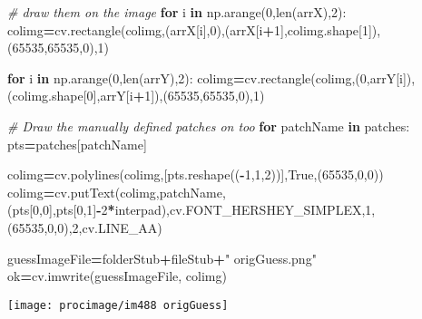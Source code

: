 \documentclass[
]{article}
\newenvironment{Shaded}{\begin{snugshade}}{\end{snugshade}}
\newcommand{\BuiltInTok}[1]{#1}
\newcommand{\CommentTok}[1]{\textcolor[rgb]{0.56,0.35,0.01}{\textit{#1}}}
\newcommand{\ControlFlowTok}[1]{\textcolor[rgb]{0.13,0.29,0.53}{\textbf{#1}}}
\newcommand{\DecValTok}[1]{\textcolor[rgb]{0.00,0.00,0.81}{#1}}
\newcommand{\KeywordTok}[1]{\textcolor[rgb]{0.13,0.29,0.53}{\textbf{#1}}}
\newcommand{\NormalTok}[1]{#1}
\newcommand{\OperatorTok}[1]{\textcolor[rgb]{0.81,0.36,0.00}{\textbf{#1}}}
\newcommand{\StringTok}[1]{\textcolor[rgb]{0.31,0.60,0.02}{#1}}
\newcommand{\VariableTok}[1]{\textcolor[rgb]{0.00,0.00,0.00}{#1}}
\begin{document}
\begin{Shaded}
\begin{Highlighting}[]
\CommentTok{\# draw them on the image}
\ControlFlowTok{for}\NormalTok{ i }\KeywordTok{in}\NormalTok{ np.arange(}\DecValTok{0}\NormalTok{,}\BuiltInTok{len}\NormalTok{(arrX),}\DecValTok{2}\NormalTok{):}
\NormalTok{  colimg}\OperatorTok{=}\NormalTok{cv.rectangle(colimg,(arrX[i],}\DecValTok{0}\NormalTok{),(arrX[i}\OperatorTok{+}\DecValTok{1}\NormalTok{],colimg.shape[}\DecValTok{1}\NormalTok{]),(}\DecValTok{65535}\NormalTok{,}\DecValTok{65535}\NormalTok{,}\DecValTok{0}\NormalTok{),}\DecValTok{1}\NormalTok{)}
  
\ControlFlowTok{for}\NormalTok{ i }\KeywordTok{in}\NormalTok{ np.arange(}\DecValTok{0}\NormalTok{,}\BuiltInTok{len}\NormalTok{(arrY),}\DecValTok{2}\NormalTok{):}
\NormalTok{  colimg}\OperatorTok{=}\NormalTok{cv.rectangle(colimg,(}\DecValTok{0}\NormalTok{,arrY[i]),(colimg.shape[}\DecValTok{0}\NormalTok{],arrY[i}\OperatorTok{+}\DecValTok{1}\NormalTok{]),(}\DecValTok{65535}\NormalTok{,}\DecValTok{65535}\NormalTok{,}\DecValTok{0}\NormalTok{),}\DecValTok{1}\NormalTok{)}
  
\CommentTok{\# Draw the manually defined patches on too}
\ControlFlowTok{for}\NormalTok{ patchName }\KeywordTok{in}\NormalTok{ patches:}
\NormalTok{    pts}\OperatorTok{=}\NormalTok{patches[patchName]}

\NormalTok{    colimg}\OperatorTok{=}\NormalTok{cv.polylines(colimg,[pts.reshape((}\OperatorTok{{-}}\DecValTok{1}\NormalTok{,}\DecValTok{1}\NormalTok{,}\DecValTok{2}\NormalTok{))],}\VariableTok{True}\NormalTok{,(}\DecValTok{65535}\NormalTok{,}\DecValTok{0}\NormalTok{,}\DecValTok{0}\NormalTok{))}
\NormalTok{    colimg}\OperatorTok{=}\NormalTok{cv.putText(colimg,patchName,(pts[}\DecValTok{0}\NormalTok{,}\DecValTok{0}\NormalTok{],pts[}\DecValTok{0}\NormalTok{,}\DecValTok{1}\NormalTok{]}\OperatorTok{{-}}\DecValTok{2}\OperatorTok{*}\NormalTok{interpad),cv.FONT\_HERSHEY\_SIMPLEX,}\DecValTok{1}\NormalTok{,(}\DecValTok{65535}\NormalTok{,}\DecValTok{0}\NormalTok{,}\DecValTok{0}\NormalTok{),}\DecValTok{2}\NormalTok{,cv.LINE\_AA)}


\NormalTok{guessImageFile}\OperatorTok{=}\NormalTok{folderStub}\OperatorTok{+}\NormalTok{fileStub}\OperatorTok{+}\StringTok{" origGuess.png"}
\NormalTok{ok}\OperatorTok{=}\NormalTok{cv.imwrite(guessImageFile, colimg)}
\end{Highlighting}
\end{Shaded}

\begin{center}\texttt{[image: procimage/im488 origGuess]} \end{center}
\end{document}
